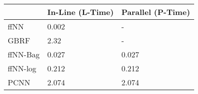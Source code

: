 \begin{tabular}{lll}
\toprule
{} & In-Line (L-Time) & Parallel (P-Time) \\
\midrule
ffNN     &            0.002 &                 - \\
GBRF     &             2.32 &                 - \\
ffNN-Bag &            0.027 &             0.027 \\
ffNN-log &            0.212 &             0.212 \\
PCNN     &            2.074 &             2.074 \\
\bottomrule
\end{tabular}

